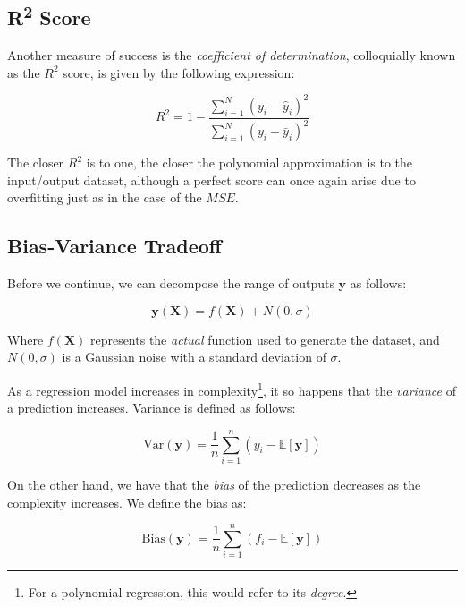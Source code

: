 \documentclass[a4paper,10pt,english]{article}
\begin{document}
\subsection*{R\textsuperscript{2} Score}

Another measure of success is the \textit{coefficient of determination}, colloquially known as the $R^2$ score, is given by the following expression:

\begin{equation}
R^2 = 1 - \frac{\sum_{i=1}^N (y_i - \hat{y}_i)^2 }{\sum_{i=1}^N (y_i - \bar{y}_i)^2 }
\end{equation}

The closer $R^2$ is to one, the closer the polynomial approximation is to the input/output dataset, although a perfect score can once again arise due to overfitting just as in the case of the $MSE$.

\subsection*{Bias-Variance Tradeoff}

Before we continue, we can decompose the range of outputs $\mathbf{y}$ as follows:

\begin{equation}
\label{eq_method_5}
\mathbf{y}(\mathbf{X}) = f(\mathbf{X}) + N(0, \sigma) 
\end{equation}

Where $f(\mathbf{X})$ represents the \textit{actual} function used to generate the dataset, and $N(0,\sigma)$ is a Gaussian noise with a standard deviation of $\sigma$.

As a regression model increases in complexity\footnote{For a polynomial regression, this would refer to its \textit{degree}.}, it so happens that the \textit{variance} of a prediction increases.  Variance is defined as follows:

\begin{equation}
\label{eq_method_6}
\text{Var}(\mathbf{y}) = \frac{1}{n} \sum_{i=1}^{n} (y_i - \mathbb{E}[\mathbf{y}] )
\end{equation}

On the other hand, we have that the \textit{bias} of the prediction decreases as the complexity increases.  We define the bias as:

\begin{equation}
\label{eq_method_7}
\text{Bias}(\mathbf{y}) = \frac{1}{n} \sum_{i=1}^{n} (f_i - \mathbb{E}[\mathbf{y}] )
\end{equation}
\end{document}
